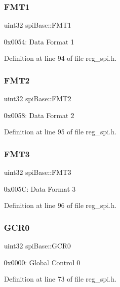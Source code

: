 \subsubsection{\texorpdfstring{F\+M\+T1}{FMT1}}
{\footnotesize\ttfamily uint32 spi\+Base\+::\+F\+M\+T1}

0x0054\+: Data Format 1 

Definition at line 94 of file reg\+\_\+spi.\+h.

\mbox{\label{structspiBase_a69bd0438efa7b1dfa000ff049aa3d9ef}} 
\subsubsection{\texorpdfstring{F\+M\+T2}{FMT2}}
{\footnotesize\ttfamily uint32 spi\+Base\+::\+F\+M\+T2}

0x0058\+: Data Format 2 

Definition at line 95 of file reg\+\_\+spi.\+h.

\mbox{\label{structspiBase_af6f811146b2b1b201f46bb9f14bf054c}} 
\subsubsection{\texorpdfstring{F\+M\+T3}{FMT3}}
{\footnotesize\ttfamily uint32 spi\+Base\+::\+F\+M\+T3}

0x005C\+: Data Format 3 

Definition at line 96 of file reg\+\_\+spi.\+h.

\mbox{\label{structspiBase_a673fb5de5c220d0f93e550c296a6b2a2}} 
\subsubsection{\texorpdfstring{G\+C\+R0}{GCR0}}
{\footnotesize\ttfamily uint32 spi\+Base\+::\+G\+C\+R0}

0x0000\+: Global Control 0 

Definition at line 73 of file reg\+\_\+spi.\+h.

\mbox{\label{structspiBase_a453b9a97d6650d3e96f926ce9571a49b}} 

